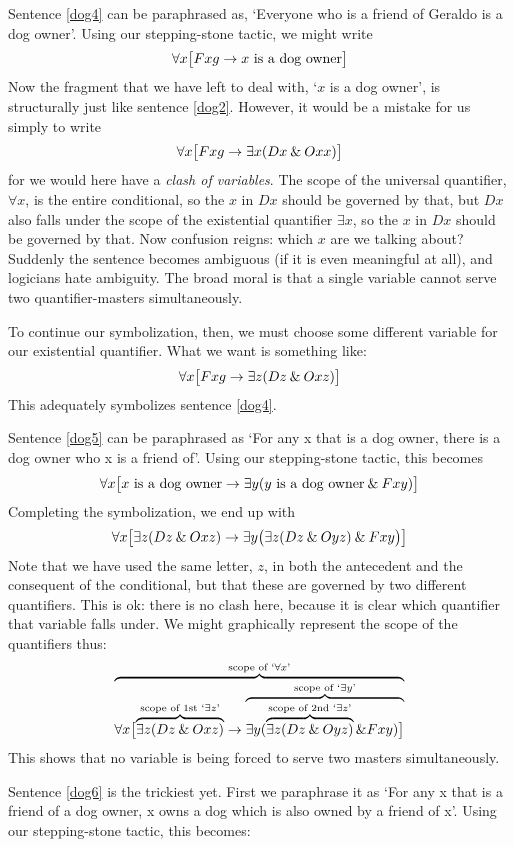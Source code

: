 Sentence \ref{dog4} can be paraphrased as, `Everyone who is a friend of Geraldo is a dog owner'. Using our stepping-stone tactic, we might write
$$\forall x \bigl[Fxg \rightarrow x \text{ is a dog owner}\bigr]$$
Now the fragment that we have left to deal with, `$x$ is a dog owner', is structurally just like sentence \ref{dog2}. However, it would be a mistake for us simply to write
$$\forall x \bigl[Fxg \rightarrow \exists x(Dx \mathbin{\&} Oxx)\bigr]$$
for we would here have a \emph{clash of variables}. The scope of the universal quantifier, $\forall x$, is the entire conditional, so the $x$ in $Dx$ should be governed by that, but $Dx$ also falls under the scope of the existential quantifier $\exists x$, so the $x$ in $Dx$ should be governed by that. Now confusion reigns: which $x$ are we talking about? Suddenly the sentence becomes ambiguous (if it is even meaningful at all), and logicians hate ambiguity. The broad moral is that a single variable cannot serve two quantifier-masters simultaneously.

To continue our symbolization, then, we must choose some different variable for our existential quantifier. What we want is something like:
$$\forall x\bigl[Fxg \rightarrow\exists z(Dz \mathbin{\&} Oxz)\bigr]$$
This adequately symbolizes sentence \ref{dog4}.

Sentence \ref{dog5} can be paraphrased as `For any x that is a dog owner, there is a dog owner who x is a friend of'. Using our stepping-stone tactic, this becomes
$$\forall x\bigl[\mbox{$x$ is a dog owner}\rightarrow\exists y(\mbox{$y$ is a dog owner}\mathbin{\&} Fxy)\bigr]$$
Completing the symbolization, we end up with
$$\forall x\bigl[\exists z(Dz \mathbin{\&} Oxz)\rightarrow\exists y\bigl(\exists z(Dz \mathbin{\&} Oyz)\mathbin{\&} Fxy\bigr)\bigr]$$
Note that we have used the same letter, $z$, in both the antecedent and the consequent of the conditional, but that these are governed by two different quantifiers. This is ok: there is no clash here, because it is clear which quantifier that variable falls under. We might graphically represent the scope of the quantifiers thus:
$$\overbrace{\forall x\bigl[\overbrace{\exists z(Dz \mathbin{\&} Oxz)}^{\text{scope of 1st `}\exists z\text{'}}\rightarrow \overbrace{\exists y(\overbrace{\exists z(Dz \mathbin{\&} Oyz)}^{\text{scope of 2nd `}\exists z\text{'}}\mathbin{\&} Fxy)\bigr]}^{\text{scope of `}\exists y\text{'}}}^{\text{scope of `}\forall x\text{'}}$$
This shows that no variable is being forced to serve two masters simultaneously.

Sentence \ref{dog6} is the trickiest yet. First we paraphrase it as `For any x that is a friend of a dog owner, x owns a dog which is also owned by a friend of x'. Using our stepping-stone tactic, this becomes:

